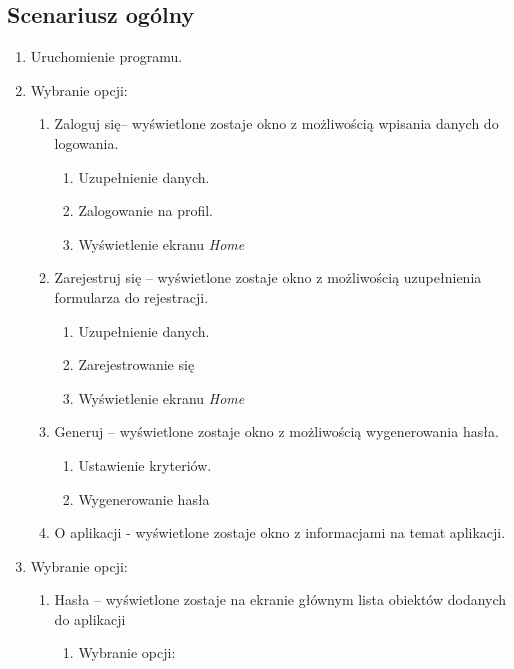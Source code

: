 \documentclass[a4paper]{article}
\begin{document}
\subsection{Scenariusz ogólny}
\begin{enumerate}
    \item Uruchomienie programu.
    \item Wybranie opcji:\label{eGłówny}
    \begin{enumerate}
        \item Zaloguj się-- wyświetlone zostaje okno z możliwością wpisania danych do logowania.
        \begin{enumerate}
            \item Uzupełnienie danych.
            \item Zalogowanie na profil.
            \item Wyświetlenie ekranu \textit{Home}
        \end{enumerate}
        \item Zarejestruj się -- wyświetlone zostaje okno z możliwością uzupełnienia formularza do rejestracji.
        \begin{enumerate}
            \item Uzupełnienie danych.
            \item Zarejestrowanie się
            \item Wyświetlenie ekranu \textit{Home}
        \end{enumerate}
        \item Generuj -- wyświetlone zostaje okno z możliwością wygenerowania hasła.\label{gen}
        \begin{enumerate}
            \item Ustawienie kryteriów.
            \item Wygenerowanie hasła
        \end{enumerate}
        \item O aplikacji - wyświetlone zostaje okno z informacjami na temat aplikacji.
    \end{enumerate}
    \item Wybranie opcji:
    \begin{enumerate}
        \item Hasła -- wyświetlone zostaje na ekranie głównym lista  obiektów dodanych do aplikacji
        \begin{enumerate}
            \item Wybranie opcji:
            \begin{enumerate}

\end{enumerate}
\end{enumerate}
\end{enumerate}
\end{enumerate}
\end{document}
